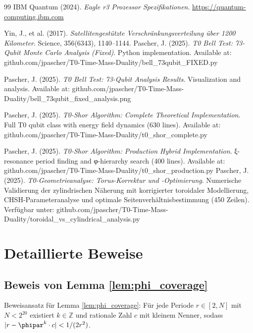 \begin{thebibliography}{99}
	IBM Quantum (2024). 
	\textit{Eagle r3 Prozessor Spezifikationen}. 
	\url{https://quantum-computing.ibm.com}
	
	Yin, J., et al. (2017). 
	\textit{Satellitengestützte Verschränkungsverteilung über 1200 Kilometer}. 
	Science, 356(6343), 1140--1144.
	Pascher, J. (2025). 
	\textit{T0 Bell Test: 73-Qubit Monte Carlo Analysis (Fixed)}. 
	Python implementation. Available at: github.com/jpascher/T0-Time-Mass-Duality/bell\_73qubit\_FIXED.py
	
	Pascher, J. (2025). 
	\textit{T0 Bell Test: 73-Qubit Analysis Results}. 
	Visualization and analysis. Available at: github.com/jpascher/T0-Time-Mass-Duality/bell\_73qubit\_fixed\_analysis.png
	
	Pascher, J. (2025). 
	\textit{T0-Shor Algorithm: Complete Theoretical Implementation}. 
	Full T0 qubit class with energy field dynamics (630 lines). Available at: github.com/jpascher/T0-Time-Mass-Duality/t0\_shor\_complete.py
	
	Pascher, J. (2025). 
	\textit{T0-Shor Algorithm: Production Hybrid Implementation}. 
	ξ-resonance period finding and φ-hierarchy search (400 lines). Available at: github.com/jpascher/T0-Time-Mass-Duality/t0\_shor\_production.py
	Pascher, J. (2025). 
	\textit{T0-Geometrieanalyse: Torus-Korrektur und -Optimierung}. 
	Numerische Validierung der zylindrischen Näherung mit korrigierter toroidaler Modellierung, CHSH-Parameteranalyse und optimale Seitenverhältnisbestimmung (450 Zeilen). Verfügbar unter: github.com/jpascher/T0-Time-Mass-Duality/toroidal\_vs\_cylindrical\_analysis.py
\end{thebibliography}

\appendix

\section{Detaillierte Beweise}
\label{app:proofs}

\subsection{Beweis von Lemma \ref{lem:phi_coverage}}
\label{app:proof_phi_coverage}

Beweisansatz für Lemma \ref{lem:phi_coverage}: Für jede Periode $r \in [2, N]$ mit $N < 2^{20}$ existiert $k \in \mathbb{Z}$ und rationale Zahl $c$ mit kleinem Nenner, sodass $|r - \phipar^k \cdot c| < 1/(2r^2)$.

